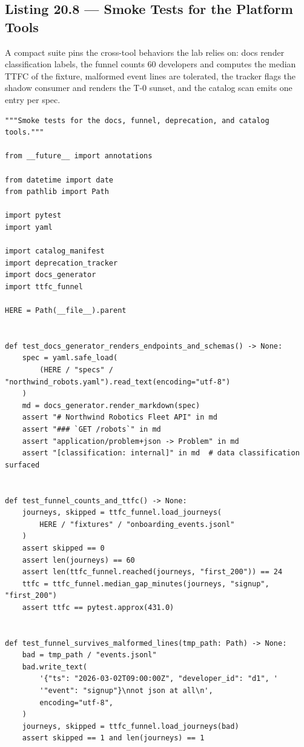 \subsection{Listing 20.8 --- Smoke Tests for the Platform Tools}
\label{sec:ch20-listing-smoke}

A compact suite pins the cross-tool behaviors the lab relies on: docs
render classification labels, the funnel counts 60 developers and computes
the median TTFC of the fixture, malformed event lines are tolerated, the
tracker flags the shadow consumer and renders the T-0 sunset, and the
catalog scan emits one entry per spec.

\begin{verbatim}
"""Smoke tests for the docs, funnel, deprecation, and catalog tools."""

from __future__ import annotations

from datetime import date
from pathlib import Path

import pytest
import yaml

import catalog_manifest
import deprecation_tracker
import docs_generator
import ttfc_funnel

HERE = Path(__file__).parent


def test_docs_generator_renders_endpoints_and_schemas() -> None:
    spec = yaml.safe_load(
        (HERE / "specs" / "northwind_robots.yaml").read_text(encoding="utf-8")
    )
    md = docs_generator.render_markdown(spec)
    assert "# Northwind Robotics Fleet API" in md
    assert "### `GET /robots`" in md
    assert "application/problem+json -> Problem" in md
    assert "[classification: internal]" in md  # data classification surfaced


def test_funnel_counts_and_ttfc() -> None:
    journeys, skipped = ttfc_funnel.load_journeys(
        HERE / "fixtures" / "onboarding_events.jsonl"
    )
    assert skipped == 0
    assert len(journeys) == 60
    assert len(ttfc_funnel.reached(journeys, "first_200")) == 24
    ttfc = ttfc_funnel.median_gap_minutes(journeys, "signup", "first_200")
    assert ttfc == pytest.approx(431.0)


def test_funnel_survives_malformed_lines(tmp_path: Path) -> None:
    bad = tmp_path / "events.jsonl"
    bad.write_text(
        '{"ts": "2026-03-02T09:00:00Z", "developer_id": "d1", '
        '"event": "signup"}\nnot json at all\n',
        encoding="utf-8",
    )
    journeys, skipped = ttfc_funnel.load_journeys(bad)
    assert skipped == 1 and len(journeys) == 1



\end{verbatim}
